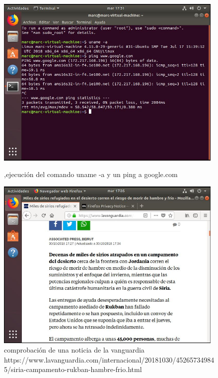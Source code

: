 \documentclass[preprint,11pt]{elsarticle}
\begin{document}
\begin{figure}[!htbp]
    \begin{center}
        \includegraphics[width=11cm]{anex/ubuntu5.JPG}
    \end{center}
    \caption{,ejecución del comando uname -a y un ping a google.com}
    \begin{center}
        \includegraphics[width=11cm]{anex/ubuntu6.JPG}
    \end{center}
    \caption{comprobación de una noticia de la vanguardia \newline https://www.lavanguardia.com/internacional/20181030/452657349845/siria-campamento-rukban-hambre-frio.html}
\end{figure}

\clearpage
\end{document}
